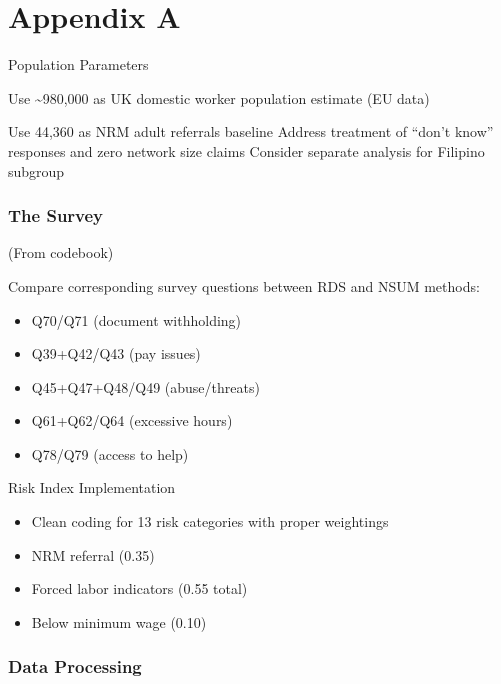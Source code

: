 \documentclass[
  12pt,
  letterpaper,
  DIV=11,
  numbers=noendperiod]{scrartcl}
\providecommand{\tightlist}{%
  \setlength{\itemsep}{0pt}\setlength{\parskip}{0pt}}
\theoremstyle{plain}
\theoremstyle{definition}
\begin{document}
\printbibliography[heading=none]

\newpage

\appendix

\section{Appendix A}\label{app-survey}

Population Parameters

Use \textasciitilde980,000 as UK domestic worker population estimate (EU
data)

Use 44,360 as NRM adult referrals baseline Address treatment of ``don't
know'' responses and zero network size claims Consider separate analysis
for Filipino subgroup

\subsubsection{The Survey}\label{the-survey}

(From codebook)

Compare corresponding survey questions between RDS and NSUM methods:

\begin{itemize}
\tightlist
\item
  Q70/Q71 (document withholding)
\item
  Q39+Q42/Q43 (pay issues)
\item
  Q45+Q47+Q48/Q49 (abuse/threats)
\item
  Q61+Q62/Q64 (excessive hours)
\item
  Q78/Q79 (access to help)
\end{itemize}

Risk Index Implementation

\begin{itemize}
\tightlist
\item
  Clean coding for 13 risk categories with proper weightings
\item
  NRM referral (0.35)
\item
  Forced labor indicators (0.55 total)
\item
  Below minimum wage (0.10)
\end{itemize}

\subsubsection{Data Processing}\label{app-dataprep}
\end{document}
